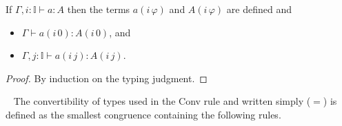 \documentclass[english]{PaperTools/latex/lipics}
\newcommand\CP[3]{(#2,_{#1} #3)}
\newcommand\CTimes[2]{(#2) ×_{#1}}
\newcommand\param[1]{\!\cdot\!#1}
\newcommand\op[1]{∋_{#1}}
\newcommand\fp[3]{⟨#2 ,_{#1} #3⟩}
\newcommand\mor[2]{({#1}\,{#2})}
\newcommand\proj[2]{{#2}\mor{#1}0}
\newcommand\comment[1]{}
\def\El#1{\mathrm{El}(#1)}
\begin{document}
\begin{theorem}
  If $Γ,i:𝕀  ⊢ a : A$ then the terms $a(i\,φ)$ and $A(i\,φ)$ are
  defined and
  \begin{itemize}
    \item $Γ ⊢ a(i\,0) : A(i\,0)$, and
    \item $Γ, j :𝕀 ⊢ a(i\,j) : A(i\,j)$.
  \end{itemize}
\end{theorem}
\begin{proof}
  By induction on the typing judgment.
\end{proof}

\comment{
\begin{definition}[Normal forms and neutral terms]~
  \begin{align*}
    \mathsf{Nf} ∋ u,v,A,B & \coloneqq
      U \mid λx:A. t \mid (x:A) → B \\
      & \mid \CP i u v \mid \fp i u v \\
      & \mid {(\CTimes {i₀} A B)} \op {i₁} {u_1 \cdots} \op {i_n} {u_n} &\quad \text{($i₀ \prec i₁ \prec \ldots \prec i_n$)} \\
      & \mid s \param {i₀} \cdots \param {i_{n-1}}                  &\quad \text{($i₀ \prec   < \ldots \prec i_{n-1}$)}
    \\
    \mathsf{Ne} ∋ s & \coloneqq x \mid s \, u
  \end{align*}
\end{definition}
}

\begin{definition}[Conversion]~
\label{def:conversion}
The convertibility of types used in the {\sc Conv} rule and written
simply ($=$) is defined as the smallest congruence containing the
following rules.
\end{definition}
\end{document}

